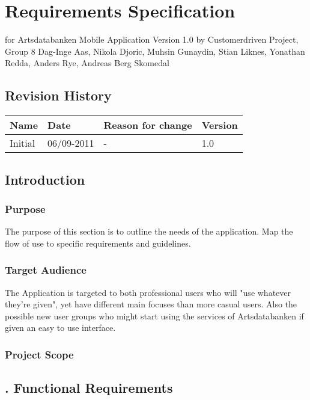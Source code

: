 \section{Requirements Specification}
\indent for Artsdatabanken Mobile Application
\indent\indent Version 1.0
\indent by Customerdriven Project, Group 8
\indent\indent Dag-Inge Aas, Nikola Djoric, Muhsin Gunaydin, Stian Liknes, Yonathan Redda, Anders Rye, Andreas Berg Skomedal
\pagebreak

\subsection{Revision History}
\begin{tabular}[t]{|l|l|l|l|}\hline
Name&Date&Reason for change&Version\\\hline\hline
Initial&06/09-2011&-&1.0\\\hline
\end{tabular}

\pagebreak

\subsection{ Introduction}

\subsubsection{ Purpose}
	The purpose of this section is to outline the needs of the application. Map the flow of use to specific requirements and guidelines.

\subsubsection{ Target Audience}
	The Application is targeted to both professional users who will "use whatever they're given", yet have different main focuses than more casual users. Also the possible new user groups who might start using the services of Artsdatabanken if given an easy to use interface.

\subsubsection{ Project Scope}

\pagebreak

\subsection{. Functional Requirements}
